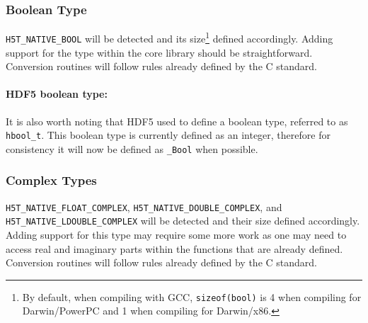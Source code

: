 \documentclass[letterpaper,hyper]{THG_RFC}
\begin{document}
\subsubsection{Boolean Type}
\texttt{H5T\_NATIVE\_BOOL} will be detected and its
size\footnote{By default, when compiling with GCC, \texttt{sizeof(bool)}
is 4 when compiling for Darwin/PowerPC and 1 when compiling for Darwin/x86.}
defined accordingly.
Adding support for the type within the core library should be straightforward.
Conversion routines will follow rules already defined by the C standard.


\paragraph{HDF5 boolean type:} It is also worth noting that HDF5 used to define
a boolean type, referred to as \texttt{hbool\_t}. This boolean type is
currently defined as an integer, therefore for consistency it will now be
defined as \texttt{\_Bool} when possible.

\subsubsection{Complex Types}
\texttt{H5T\_NATIVE\_FLOAT\_COMPLEX}, \texttt{H5T\_NATIVE\_DOUBLE\_COMPLEX},
and \texttt{H5T\_NATIVE\_LDOUBLE\_COMPLEX} will be detected and their size
defined accordingly.
Adding support for this type may require some more work as one may need to
access real and imaginary parts within the functions that are already defined.
Conversion routines will follow rules already defined by the C standard.
\end{document}
